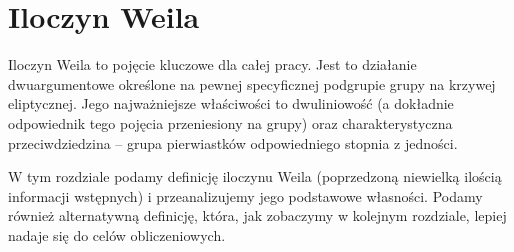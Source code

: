 \chapter{Iloczyn Weila}

Iloczyn Weila to pojęcie kluczowe dla całej pracy.
Jest to działanie dwuargumentowe
określone na pewnej specyficznej podgrupie grupy na krzywej eliptycznej.
Jego najważniejsze właściwości to dwuliniowość
(a dokładnie odpowiednik tego pojęcia przeniesiony na grupy)
oraz charakterystyczna przeciwdziedzina --
grupa pierwiastków odpowiedniego stopnia z jedności.

W tym rozdziale podamy definicję iloczynu Weila
(poprzedzoną niewielką ilością informacji wstępnych)
i przeanalizujemy jego podstawowe własności.
Podamy również alternatywną definicję, która,
jak zobaczymy w kolejnym rozdziale,
lepiej nadaje się do celów obliczeniowych.






